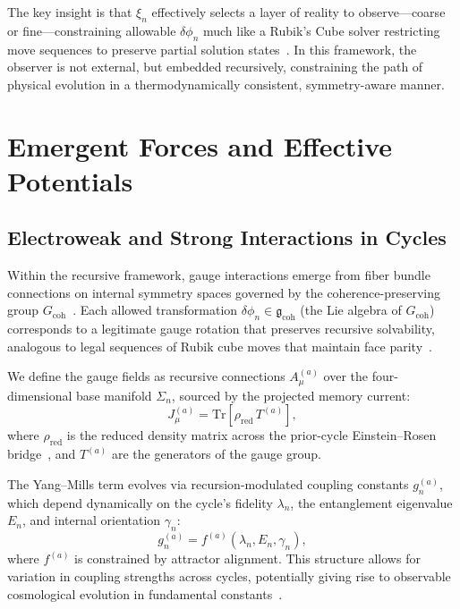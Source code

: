 \documentclass[11pt]{article}
\begin{document}
The key insight is that $\xi_n$ effectively selects a layer of reality to observe—coarse or fine—constraining allowable $\delta \phi_n$ much like a Rubik's Cube solver restricting move sequences to preserve partial solution states~\cite{zurek2003decoherence}. In this framework, the observer is not external, but embedded recursively, constraining the path of physical evolution in a thermodynamically consistent, symmetry-aware manner.





\section{Emergent Forces and Effective Potentials}

\subsection{Electroweak and Strong Interactions in Cycles}

Within the recursive framework, gauge interactions emerge from fiber bundle connections on internal symmetry spaces governed by the coherence-preserving group $G_{\text{coh}}$~\cite{peskin1995introduction}. Each allowed transformation $\delta \phi_n \in \mathfrak{g}_{\text{coh}}$ (the Lie algebra of $G_{\text{coh}}$) corresponds to a legitimate gauge rotation that preserves recursive solvability, analogous to legal sequences of Rubik cube moves that maintain face parity~\cite{joyner2008adventures}.

We define the gauge fields as recursive connections $A_\mu^{(a)}$ over the four-dimensional base manifold $\Sigma_n$, sourced by the projected memory current:
\[
J_\mu^{(a)} = \mathrm{Tr}\left[ \rho_{\text{red}} \, T^{(a)} \right],
\]
where $\rho_{\text{red}}$ is the reduced density matrix across the prior-cycle Einstein–Rosen bridge~\cite{maldacena2013cool}, and $T^{(a)}$ are the generators of the gauge group. 

The Yang–Mills term evolves via recursion-modulated coupling constants $g_n^{(a)}$, which depend dynamically on the cycle's fidelity $\lambda_n$, the entanglement eigenvalue $E_n$, and internal orientation $\gamma_n$:
\[
g_n^{(a)} = f^{(a)}(\lambda_n, E_n, \gamma_n),
\]
where $f^{(a)}$ is constrained by attractor alignment. This structure allows for variation in coupling strengths across cycles, potentially giving rise to observable cosmological evolution in fundamental constants~\cite{ashtekar2006quantum}.
\end{document}
